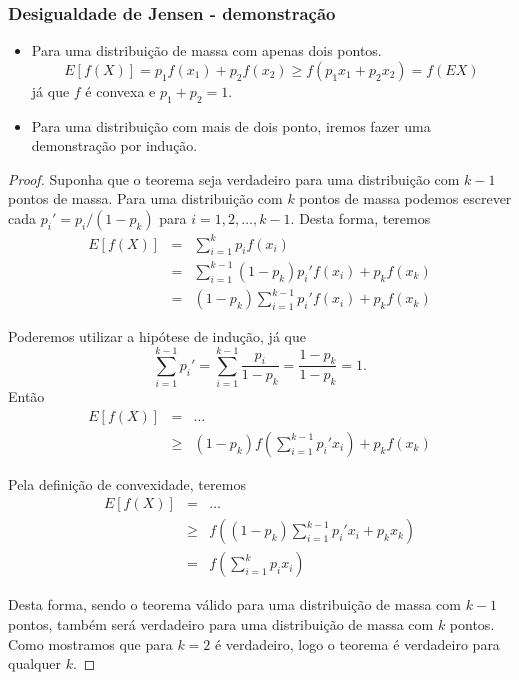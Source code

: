 \begin{frame}[allowframebreaks]
  \frametitle{Desigualdade de Jensen - demonstração}
  \begin{itemize}
   \item Para uma distribuição de massa com apenas dois pontos.
   \begin{equation}
    E[f(X)] = p_1 f(x_1) + p_2 f(x_2) \geq f(p_1 x_1 + p_2 x_2) = f(EX)
   \end{equation} 
   já que $f$ é convexa e $p_1+p_2=1$.
   \item Para uma distribuição com mais de dois ponto, iremos fazer uma demonstração 
   por indução.
  \end{itemize}

  \begin{proof}
  Suponha que o teorema seja verdadeiro para uma distribuição com $k-1$ pontos de massa.
  Para uma distribuição com $k$ pontos de massa podemos escrever cada 
  $p_i' = p_i / (1-p_k)$ para $i=1,2,\ldots,k-1$. 
  \proofbreak
  Desta forma, teremos
  \begin{eqnarray}
   E[f(X)] &=& \sum_{i=1}^k p_i f(x_i) \nonumber \\
        &=& \sum_{i=1}^{k-1} (1-p_k)p_i' f(x_i) + p_k f(x_k) \nonumber \\
        &=& (1-p_k) \sum_{i=1}^{k-1} p_i' f(x_i) + p_k f(x_k) \nonumber 
   \end{eqnarray}

   \proofbreak

   Poderemos utilizar a hipótese de indução, já que
   \begin{equation}
   \sum_{i=1}^{k-1} p_i' = \sum_{i=1}^{k-1} \frac{p_i}{1-p_k} = \frac{1-p_k}{1-p_k} = 1 .
   \end{equation}
   Então
   \begin{eqnarray}
   E[f(X)] &=& \ldots \nonumber \\
        &\geq& (1-p_k) f\left( \sum_{i=1}^{k-1} p_i' x_i \right) + p_k f(x_k) \nonumber
   \end{eqnarray}
  
   \proofbreak

   Pela definição de convexidade, teremos
   \begin{eqnarray}
   E[f(X)] &=& \ldots \nonumber \\
        &\geq& f \left( (1-p_k) \sum_{i=1}^{k-1} p_i' x_i + p_k x_k \right) \nonumber \\ 
        &=& f\left( \sum_{i=1}^{k} p_i x_i \right)
   \end{eqnarray}

   Desta forma, sendo o teorema válido para uma distribuição de massa com $k-1$ pontos,
   também será verdadeiro para uma distribuição de massa com $k$ pontos.
   Como mostramos que para $k=2$ é verdadeiro, logo o teorema é verdadeiro para qualquer $k$.
  \end{proof}
\end{frame}

